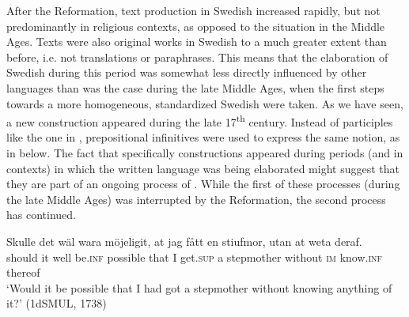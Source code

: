 \documentclass[output=paper]{langscibook}
\begin{document}
After the Reformation, text production in Swedish increased rapidly, but not predominantly in religious contexts, as opposed to the situation in the Middle Ages. Texts were also original works in Swedish to a much greater extent than before, i.e. not translations or paraphrases. This means that the elaboration of Swedish during this period was somewhat less directly influenced by other languages than was the case during the late Middle Ages, when the first steps towards a more homogeneous, standardized Swedish were taken. As we have seen, a new  construction appeared during the late 17\textsuperscript{th} century. Instead of participles like the one in , prepositional infinitives were used to express the same  notion, as in  below. The fact that specifically  constructions appeared during periods (and in contexts) in which the written language was being elaborated might suggest that they are part of an ongoing process of . While the first of these processes (during the late Middle Ages) was interrupted by the Reformation, the second process has continued. 


\ea
\label{ex:kalm:34}
 \gll Skulle det wäl wara möjeligit, at jag fått en stiufmor, utan at weta deraf.\\
should it well be.\textsc{inf} possible that I get.\textsc{sup} a stepmother without \textsc{im} know.\textsc{inf} thereof\\
\glt ‘Would it be possible that I had got a stepmother without knowing anything of it?’ (1dSMUL, 1738)
\z
\end{document}

